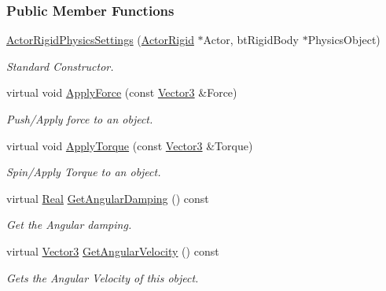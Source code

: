 \subsubsection*{Public Member Functions}
\begin{DoxyCompactItemize}
\item 
\hyperlink{classphys_1_1ActorRigidPhysicsSettings_a002e4932e1d8192a7aa45c1e4c159774}{ActorRigidPhysicsSettings} (\hyperlink{classphys_1_1ActorRigid}{ActorRigid} $\ast$Actor, btRigidBody $\ast$PhysicsObject)
\begin{DoxyCompactList}\small\item\em Standard Constructor. \item\end{DoxyCompactList}\item 
virtual void \hyperlink{classphys_1_1ActorRigidPhysicsSettings_a3738b083fd0c21e07176c302f63ce993}{ApplyForce} (const \hyperlink{classphys_1_1Vector3}{Vector3} \&Force)
\begin{DoxyCompactList}\small\item\em Push/Apply force to an object. \item\end{DoxyCompactList}\item 
virtual void \hyperlink{classphys_1_1ActorRigidPhysicsSettings_ad95f1a52c00ab5af3add795b547970a5}{ApplyTorque} (const \hyperlink{classphys_1_1Vector3}{Vector3} \&Torque)
\begin{DoxyCompactList}\small\item\em Spin/Apply Torque to an object. \item\end{DoxyCompactList}\item 
virtual \hyperlink{namespacephys_af7eb897198d265b8e868f45240230d5f}{Real} \hyperlink{classphys_1_1ActorRigidPhysicsSettings_a91df099d9af175cc5f5a0f253c8e1f32}{GetAngularDamping} () const 
\begin{DoxyCompactList}\small\item\em Get the Angular damping. \item\end{DoxyCompactList}\item 
virtual \hyperlink{classphys_1_1Vector3}{Vector3} \hyperlink{classphys_1_1ActorRigidPhysicsSettings_a20e3be137706e477f94b66ed2dbb56de}{GetAngularVelocity} () const 
\begin{DoxyCompactList}\small\item\em Gets the Angular Velocity of this object. \item\end{DoxyCompactList}\item 

\end{DoxyCompactItemize}
